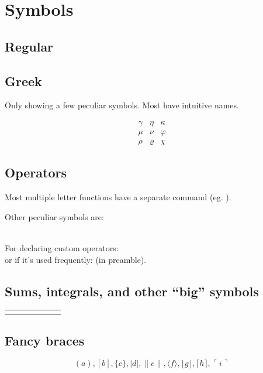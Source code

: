 \section{Symbols}
\subsection*{Regular}
\subsection*{Greek}
Only showing a few peculiar symbols. Most have intuitive names.\\
\begin{example}
\[\begin{matrix}
  \gamma & \eta    & \kappa\\
  \mu    & \nu     & \varphi\\
  \rho   & \varrho & \chi
\end{matrix}\]
\end{example}
\subsection*{Operators}
Most multiple letter functions have a separate command (eg. \mcodeshow{\sin}).

Other peculiar symbols are:\\
\mcodeshow{\liminf}\\
\mcodeshow{\limsup}

For declaring custom operators:
\\
or if it's used frequently: \code{\DeclareMathOperator*{\atan}{atan}} (in preamble).
\pagebreak
\subsection*{Sums, integrals, and other ``big'' symbols}
\begin{longtable}{l l | l l | l l}
  \codeshowB{\sum      }{\prod      }{\coprod}
  \codeshowB{\bigoplus }{\bigotimes }{\bigodot}
  \codeshowB{\bigcup   }{\bigcap    }{\biguplus}
  \codeshowB{\bigsqcup }{\bigvee    }{\bigwedge}
  \codeshowB{\int      }{\oint      }{\iint}
  \codeshowB{\iiint    }{\iiiint    }{\idotsint}
\end{longtable}

\subsection*{Fancy braces}
\begin{example}
\[
( a ), [ b ], \{ c \}, | d |, \| e \|,
\langle f \rangle, \lfloor g \rfloor,
\lceil h \rceil, \ulcorner i \urcorner
\]
\end{example}


